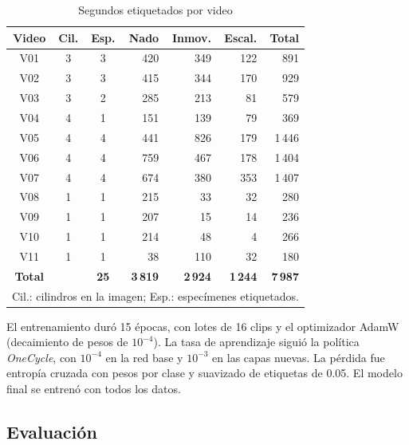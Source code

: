 \documentclass[conference,letterpaper]{IEEEtran}
\begin{document}
\begin{table}[t]
\renewcommand{\arraystretch}{1.1}
\setlength{\tabcolsep}{4pt}
\caption{Segundos etiquetados por video}
\label{tab:datos}
\centering
\footnotesize
\begin{tabular}{|c|c|c|r|r|r|r|}
\hline
\textbf{Video} & \textbf{Cil.} & \textbf{Esp.} & \textbf{Nado} & \textbf{Inmov.} & \textbf{Escal.} & \textbf{Total} \\
\hline
V01 & 3 & 3 & 420 & 349 & 122 & 891 \\
V02 & 3 & 3 & 415 & 344 & 170 & 929 \\
V03 & 3 & 2 & 285 & 213 & 81 & 579 \\
V04 & 4 & 1 & 151 & 139 & 79 & 369 \\
V05 & 4 & 4 & 441 & 826 & 179 & 1\,446 \\
V06 & 4 & 4 & 759 & 467 & 178 & 1\,404 \\
V07 & 4 & 4 & 674 & 380 & 353 & 1\,407 \\
V08 & 1 & 1 & 215 & 33 & 32 & 280 \\
V09 & 1 & 1 & 207 & 15 & 14 & 236 \\
V10 & 1 & 1 & 214 & 48 & 4 & 266 \\
V11 & 1 & 1 & 38 & 110 & 32 & 180 \\
\hline
\textbf{Total} & & \textbf{25} & \textbf{3\,819} & \textbf{2\,924} & \textbf{1\,244} & \textbf{7\,987} \\
\hline
\multicolumn{7}{l}{Cil.: cilindros en la imagen; Esp.: especímenes etiquetados.}
\end{tabular}
\end{table}

El entrenamiento duró 15 épocas, con lotes de 16 clips y el optimizador AdamW (decaimiento
de pesos de $10^{-4}$). La tasa de aprendizaje siguió la política \textit{OneCycle}, con
$10^{-4}$ en la red base y $10^{-3}$ en las capas nuevas. La pérdida fue entropía cruzada
con pesos por clase y suavizado de etiquetas de 0.05. El modelo final se entrenó con todos
los datos.

\subsection{Evaluación}
\end{document}
